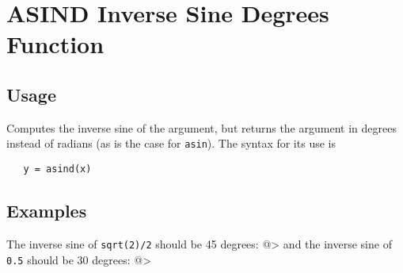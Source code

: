 \section{ASIND Inverse Sine Degrees Function}

\subsection{Usage}

Computes the inverse sine of the argument, but returns
the argument in degrees instead of radians (as is the case
for \verb|asin|). The syntax for its use is
\begin{verbatim}
   y = asind(x)
\end{verbatim}
\subsection{Examples}

The inverse sine of \verb|sqrt(2)/2| should be 45 degrees:
@>
and the inverse sine of \verb|0.5| should be 30 degrees:
@>
